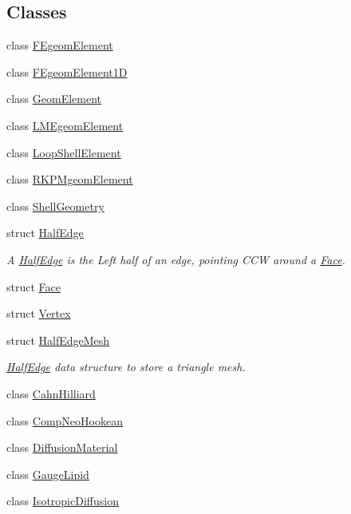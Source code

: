 \subsection*{Classes}
\begin{DoxyCompactItemize}
\item 
class \hyperlink{classvoom_1_1_f_egeom_element}{FEgeomElement}
\item 
class \hyperlink{classvoom_1_1_f_egeom_element1_d}{FEgeomElement1D}
\item 
class \hyperlink{classvoom_1_1_geom_element}{GeomElement}
\item 
class \hyperlink{classvoom_1_1_l_m_egeom_element}{LMEgeomElement}
\item 
class \hyperlink{classvoom_1_1_loop_shell_element}{LoopShellElement}
\item 
class \hyperlink{classvoom_1_1_r_k_p_mgeom_element}{RKPMgeomElement}
\item 
class \hyperlink{classvoom_1_1_shell_geometry}{ShellGeometry}
\item 
struct \hyperlink{structvoom_1_1_half_edge}{HalfEdge}
\begin{DoxyCompactList}\small\item\em A \hyperlink{structvoom_1_1_half_edge}{HalfEdge} is the Left half of an edge, pointing CCW around a \hyperlink{structvoom_1_1_face}{Face}. \item\end{DoxyCompactList}\item 
struct \hyperlink{structvoom_1_1_face}{Face}
\item 
struct \hyperlink{structvoom_1_1_vertex}{Vertex}
\item 
struct \hyperlink{structvoom_1_1_half_edge_mesh}{HalfEdgeMesh}
\begin{DoxyCompactList}\small\item\em \hyperlink{structvoom_1_1_half_edge}{HalfEdge} data structure to store a triangle mesh. \item\end{DoxyCompactList}\item 
class \hyperlink{classvoom_1_1_cahn_hilliard}{CahnHilliard}
\item 
class \hyperlink{classvoom_1_1_comp_neo_hookean}{CompNeoHookean}
\item 
class \hyperlink{classvoom_1_1_diffusion_material}{DiffusionMaterial}
\item 
class \hyperlink{classvoom_1_1_gauge_lipid}{GaugeLipid}
\item 
class \hyperlink{classvoom_1_1_isotropic_diffusion}{IsotropicDiffusion}

\end{DoxyCompactItemize}
